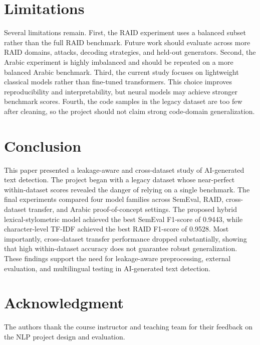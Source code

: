 \documentclass[conference]{IEEEtran}
\begin{document}
\section{Limitations}
Several limitations remain. First, the RAID experiment uses a balanced subset rather than the full RAID benchmark. Future work should evaluate across more RAID domains, attacks, decoding strategies, and held-out generators. Second, the Arabic experiment is highly imbalanced and should be repeated on a more balanced Arabic benchmark. Third, the current study focuses on lightweight classical models rather than fine-tuned transformers. This choice improves reproducibility and interpretability, but neural models may achieve stronger benchmark scores. Fourth, the code samples in the legacy dataset are too few after cleaning, so the project should not claim strong code-domain generalization.

\section{Conclusion}
This paper presented a leakage-aware and cross-dataset study of AI-generated text detection. The project began with a legacy dataset whose near-perfect within-dataset scores revealed the danger of relying on a single benchmark. The final experiments compared four model families across SemEval, RAID, cross-dataset transfer, and Arabic proof-of-concept settings. The proposed hybrid lexical-stylometric model achieved the best SemEval F1-score of 0.9443, while character-level TF-IDF achieved the best RAID F1-score of 0.9528. Most importantly, cross-dataset transfer performance dropped substantially, showing that high within-dataset accuracy does not guarantee robust generalization. These findings support the need for leakage-aware preprocessing, external evaluation, and multilingual testing in AI-generated text detection.

\section*{Acknowledgment}
The authors thank the course instructor and teaching team for their feedback on the NLP project design and evaluation.

\balance


\end{document}
